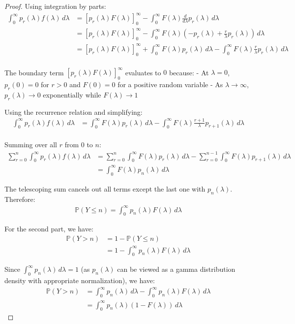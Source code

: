 \documentclass[letterpaper, 11pt]{article}
\newcommand{\1}{\mathds{1}}	%
\theoremstyle{definition}
\begin{document}
\begin{proof}
Using integration by parts:
\begin{align*}
\int_{0}^{\infty} p_r(\lambda) f(\lambda) \, d\lambda &= \left[ p_r(\lambda) F(\lambda) \right]_{0}^{\infty} - \int_{0}^{\infty} F(\lambda) \frac{d}{d\lambda}p_r(\lambda) \, d\lambda \\
&= \left[ p_r(\lambda) F(\lambda) \right]_{0}^{\infty} - \int_{0}^{\infty} F(\lambda) \left(-p_r(\lambda) + \frac{r}{\lambda}p_r(\lambda)\right) \, d\lambda \\
&= \left[ p_r(\lambda) F(\lambda) \right]_{0}^{\infty} + \int_{0}^{\infty} F(\lambda)p_r(\lambda) \, d\lambda - \int_{0}^{\infty} F(\lambda)\frac{r}{\lambda}p_r(\lambda) \, d\lambda \\
\end{align*}

The boundary term $\left[ p_r(\lambda) F(\lambda) \right]_{0}^{\infty}$ evaluates to $0$ because:
- At $\lambda = 0$, $p_r(0) = 0$ for $r > 0$ and $F(0) = 0$ for a positive random variable
- As $\lambda \to \infty$, $p_r(\lambda) \to 0$ exponentially while $F(\lambda) \to 1$

Using the recurrence relation and simplifying:
\begin{align*}
\int_{0}^{\infty} p_r(\lambda) f(\lambda) \, d\lambda &= \int_{0}^{\infty} F(\lambda)p_r(\lambda) \, d\lambda - \int_{0}^{\infty} F(\lambda)\frac{r+1}{\lambda}p_{r+1}(\lambda) \, d\lambda \\
\end{align*}

Summing over all $r$ from $0$ to $n$:
\begin{align*}
\sum_{r=0}^{n} \int_{0}^{\infty} p_r(\lambda) f(\lambda) \, d\lambda &= \sum_{r=0}^{n} \int_{0}^{\infty} F(\lambda)p_r(\lambda) \, d\lambda - \sum_{r=0}^{n-1} \int_{0}^{\infty} F(\lambda)p_{r+1}(\lambda) \, d\lambda \\
&= \int_{0}^{\infty} F(\lambda)p_n(\lambda) \, d\lambda
\end{align*}

The telescoping sum cancels out all terms except the last one with $p_n(\lambda)$. Therefore:
\begin{align*}
\mathbb{P}(Y \leq n) = \int_{0}^{\infty} p_n(\lambda)F(\lambda) \, d\lambda
\end{align*}

For the second part, we have:
\begin{align*}
\mathbb{P}(Y > n) &= 1 - \mathbb{P}(Y \leq n) \\
&= 1 - \int_{0}^{\infty} p_n(\lambda)F(\lambda) \, d\lambda
\end{align*}

Since $\int_{0}^{\infty} p_n(\lambda) \, d\lambda = 1$ (as $p_n(\lambda)$ can be viewed as a gamma distribution density with appropriate normalization), we have:
\begin{align*}
\mathbb{P}(Y > n) &= \int_{0}^{\infty} p_n(\lambda) \, d\lambda - \int_{0}^{\infty} p_n(\lambda)F(\lambda) \, d\lambda \\
&= \int_{0}^{\infty} p_n(\lambda)(1-F(\lambda)) \, d\lambda
\end{align*}
\end{proof}
\end{document}
